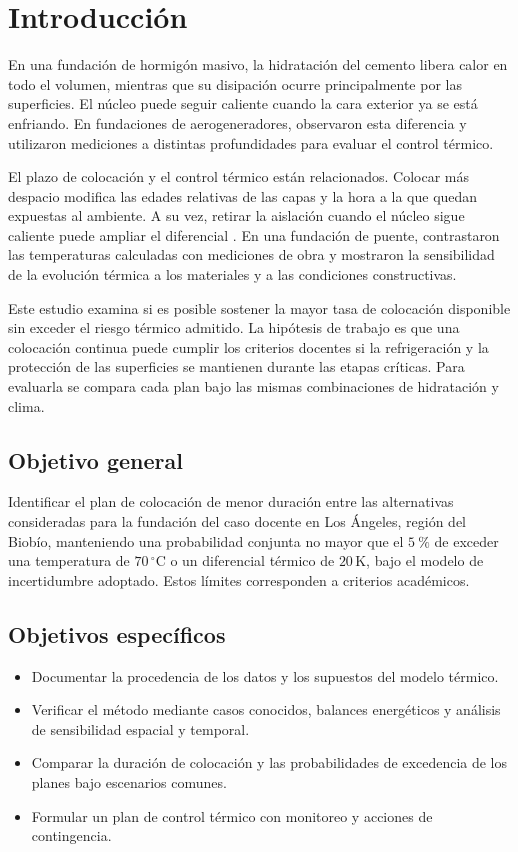 \section{Introducción}
\label{sec:introduccion}

En una fundación de hormigón masivo, la hidratación del cemento libera calor en todo el volumen, mientras que su disipación ocurre principalmente por las superficies. El núcleo puede seguir caliente cuando la cara exterior ya se está enfriando. En fundaciones de aerogeneradores, \citet{ju2019} observaron esta diferencia y utilizaron mediciones a distintas profundidades para evaluar el control térmico.

El plazo de colocación y el control térmico están relacionados. Colocar más despacio modifica las edades relativas de las capas y la hora a la que quedan expuestas al ambiente. A su vez, retirar la aislación cuando el núcleo sigue caliente puede ampliar el diferencial \citep{ichControlTermico}. En una fundación de puente, \citet{sargam2019} contrastaron las temperaturas calculadas con mediciones de obra y mostraron la sensibilidad de la evolución térmica a los materiales y a las condiciones constructivas.

Este estudio examina si es posible sostener la mayor tasa de colocación disponible sin exceder el riesgo térmico admitido. La hipótesis de trabajo es que una colocación continua puede cumplir los criterios docentes si la refrigeración y la protección de las superficies se mantienen durante las etapas críticas. Para evaluarla se compara cada plan bajo las mismas combinaciones de hidratación y clima.

\subsection{Objetivo general}
Identificar el plan de colocación de menor duración entre las alternativas consideradas para la fundación del caso docente en Los Ángeles, región del Biobío, manteniendo una probabilidad conjunta no mayor que el $5~\%$ de exceder una temperatura de $70\,^{\circ}\mathrm{C}$ o un diferencial térmico de $20\,\mathrm{K}$, bajo el modelo de incertidumbre adoptado. Estos límites corresponden a criterios académicos.

\subsection{Objetivos específicos}
\begin{itemize}
    \item Documentar la procedencia de los datos y los
    supuestos del modelo térmico.
    \item Verificar el método mediante casos conocidos,
    balances energéticos y análisis de sensibilidad
    espacial y temporal.
    \item Comparar la duración de colocación y las
    probabilidades de excedencia de los planes bajo
    escenarios comunes.
    \item Formular un plan de control térmico con
    monitoreo y acciones de contingencia.
\end{itemize}